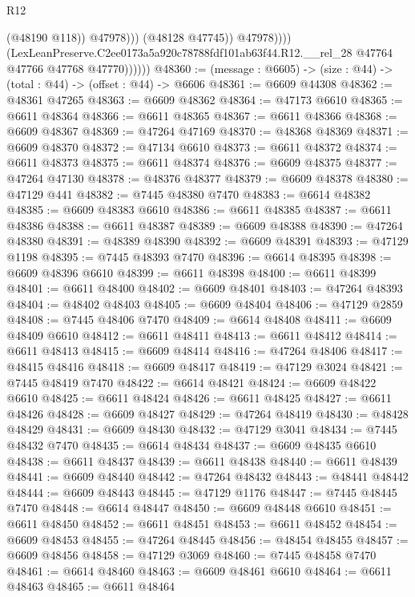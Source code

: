 \begin{lexlean}{R12}
\begin{coremodule}
                                (@48190 @118))
                              @47978)))
                        (@48128 @47745))
                      @47978))))
              (LexLeanPreserve.C2ee0173a5a920c78788fdf101ab63f44.R12.__rel_28
                @47764
                @47766
                @47768
                @47770))))))
@48360 := (message : @6605) -> (size : @44) -> (total : @44) -> (offset : @44) -> @6606
@48361 := @6609 @44308
@48362 := @48361 @47265
@48363 := @6609 @48362
@48364 := @47173 @6610
@48365 := @6611 @48364
@48366 := @6611 @48365
@48367 := @6611 @48366
@48368 := @6609 @48367
@48369 := @47264 @47169
@48370 := @48368 @48369
@48371 := @6609 @48370
@48372 := @47134 @6610
@48373 := @6611 @48372
@48374 := @6611 @48373
@48375 := @6611 @48374
@48376 := @6609 @48375
@48377 := @47264 @47130
@48378 := @48376 @48377
@48379 := @6609 @48378
@48380 := @47129 @441
@48382 := @7445 @48380 @7470
@48383 := @6614 @48382
@48385 := @6609 @48383 @6610
@48386 := @6611 @48385
@48387 := @6611 @48386
@48388 := @6611 @48387
@48389 := @6609 @48388
@48390 := @47264 @48380
@48391 := @48389 @48390
@48392 := @6609 @48391
@48393 := @47129 @1198
@48395 := @7445 @48393 @7470
@48396 := @6614 @48395
@48398 := @6609 @48396 @6610
@48399 := @6611 @48398
@48400 := @6611 @48399
@48401 := @6611 @48400
@48402 := @6609 @48401
@48403 := @47264 @48393
@48404 := @48402 @48403
@48405 := @6609 @48404
@48406 := @47129 @2859
@48408 := @7445 @48406 @7470
@48409 := @6614 @48408
@48411 := @6609 @48409 @6610
@48412 := @6611 @48411
@48413 := @6611 @48412
@48414 := @6611 @48413
@48415 := @6609 @48414
@48416 := @47264 @48406
@48417 := @48415 @48416
@48418 := @6609 @48417
@48419 := @47129 @3024
@48421 := @7445 @48419 @7470
@48422 := @6614 @48421
@48424 := @6609 @48422 @6610
@48425 := @6611 @48424
@48426 := @6611 @48425
@48427 := @6611 @48426
@48428 := @6609 @48427
@48429 := @47264 @48419
@48430 := @48428 @48429
@48431 := @6609 @48430
@48432 := @47129 @3041
@48434 := @7445 @48432 @7470
@48435 := @6614 @48434
@48437 := @6609 @48435 @6610
@48438 := @6611 @48437
@48439 := @6611 @48438
@48440 := @6611 @48439
@48441 := @6609 @48440
@48442 := @47264 @48432
@48443 := @48441 @48442
@48444 := @6609 @48443
@48445 := @47129 @1176
@48447 := @7445 @48445 @7470
@48448 := @6614 @48447
@48450 := @6609 @48448 @6610
@48451 := @6611 @48450
@48452 := @6611 @48451
@48453 := @6611 @48452
@48454 := @6609 @48453
@48455 := @47264 @48445
@48456 := @48454 @48455
@48457 := @6609 @48456
@48458 := @47129 @3069
@48460 := @7445 @48458 @7470
@48461 := @6614 @48460
@48463 := @6609 @48461 @6610
@48464 := @6611 @48463
@48465 := @6611 @48464

\end{coremodule}
\end{lexlean}
